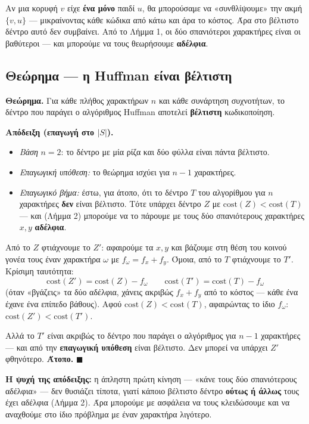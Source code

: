 \documentclass[11pt,a4paper]{article}
\begin{document}
Αν μια κορυφή $v$ είχε \textbf{ένα μόνο} παιδί $u$, θα μπορούσαμε να
«συνθλίψουμε» την ακμή $\{v, u\}$ --- μικραίνοντας κάθε κώδικα από κάτω και άρα
το κόστος. Άρα στο βέλτιστο δέντρο αυτό δεν συμβαίνει. Από το Λήμμα 1, οι δύο
σπανιότεροι χαρακτήρες είναι οι βαθύτεροι --- και μπορούμε να τους θεωρήσουμε
\textbf{αδέλφια}.

\subsection{Θεώρημα --- η Huffman είναι βέλτιστη}

\begin{keypoint}
\textbf{Θεώρημα.} Για κάθε πλήθος χαρακτήρων $n$ και κάθε συνάρτηση συχνοτήτων,
το δέντρο που παράγει ο αλγόριθμος Huffman αποτελεί \textbf{βέλτιστη}
κωδικοποίηση.
\end{keypoint}

\textbf{Απόδειξη (επαγωγή στο $|S|$).}
\begin{itemize}
  \item \textit{Βάση} $n = 2$: το δέντρο με μία ρίζα και δύο φύλλα είναι πάντα
  βέλτιστο.
  \item \textit{Επαγωγική υπόθεση:} το θεώρημα ισχύει για $n - 1$ χαρακτήρες.
  \item \textit{Επαγωγικό βήμα:} έστω, για άτοπο, ότι το δέντρο $T$ του
  αλγορίθμου για $n$ χαρακτήρες \textbf{δεν} είναι βέλτιστο. Τότε υπάρχει δέντρο
  $Z$ με $\text{cost}(Z) < \text{cost}(T)$ --- και (Λήμμα 2) μπορούμε να το
  πάρουμε με τους δύο σπανιότερους χαρακτήρες $x, y$ \textbf{αδέλφια}.
\end{itemize}
Από το $Z$ φτιάχνουμε το $Z'$: αφαιρούμε τα $x, y$ και βάζουμε στη θέση του
κοινού γονέα τους έναν χαρακτήρα $\omega$ με $f_\omega = f_x + f_y$. Όμοια, από
το $T$ φτιάχνουμε το $T'$. Κρίσιμη ταυτότητα:
\[
\text{cost}(Z') = \text{cost}(Z) - f_\omega \qquad \text{cost}(T') =
\text{cost}(T) - f_\omega
\]
(όταν «βγάζεις» τα δύο αδέλφια, χάνεις ακριβώς $f_x + f_y$ από το κόστος --- κάθε
ένα έχανε ένα επίπεδο βάθους). Αφού $\text{cost}(Z) < \text{cost}(T)$,
αφαιρώντας το ίδιο $f_\omega$: $\text{cost}(Z') < \text{cost}(T')$.

Αλλά το $T'$ είναι ακριβώς το δέντρο που παράγει ο αλγόριθμος για $n - 1$
χαρακτήρες --- και από την \textbf{επαγωγική υπόθεση} είναι βέλτιστο. Δεν μπορεί
να υπάρχει $Z'$ φθηνότερο. \textbf{Άτοπο.} $\blacksquare$

\begin{intuition}
\textbf{Η ψυχή της απόδειξης:} η άπληστη πρώτη κίνηση --- «κάνε τους δύο
σπανιότερους αδέλφια» --- δεν θυσιάζει τίποτα, γιατί κάποιο βέλτιστο δέντρο
\textbf{ούτως ή άλλως} τους έχει αδέλφια (Λήμμα 2). Άρα μπορούμε με ασφάλεια να
τους κλειδώσουμε και να αναχθούμε στο ίδιο πρόβλημα με έναν χαρακτήρα λιγότερο.
\end{intuition}
\end{document}
